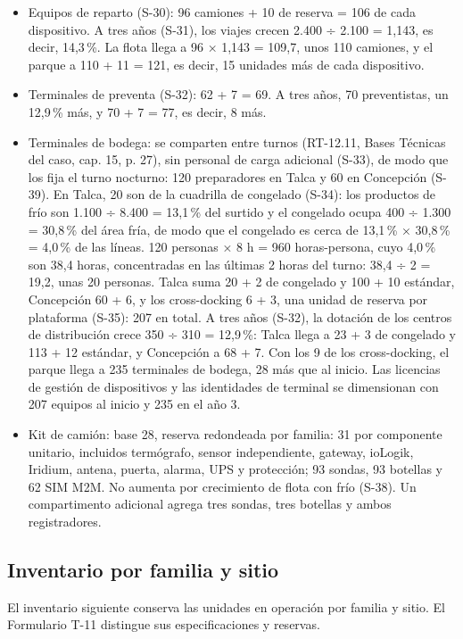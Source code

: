\begin{itemize}
  \item Equipos de reparto (S-30): 96 camiones + 10 de reserva = 106 de cada dispositivo. A tres años (S-31), los viajes crecen 2.400 ÷ 2.100 = 1,143, es decir, 14,3\,\%. La flota llega a 96 × 1,143 = 109,7, unos 110 camiones, y el parque a 110 + 11 = 121, es decir, 15 unidades más de cada dispositivo.
  \item Terminales de preventa (S-32): 62 + 7 = 69. A tres años, 70 preventistas, un 12,9\,\% más, y 70 + 7 = 77, es decir, 8 más.
  \item Terminales de bodega: se comparten entre turnos (RT-12.11, Bases Técnicas del caso, cap. 15, p. 27), sin personal de carga adicional (S-33), de modo que los fija el turno nocturno: 120 preparadores en Talca y 60 en Concepción (S-39). En Talca, 20 son de la cuadrilla de congelado (S-34): los productos de frío son 1.100 ÷ 8.400 = 13,1\,\% del surtido y el congelado ocupa 400 ÷ 1.300 = 30,8\,\% del área fría, de modo que el congelado es cerca de 13,1\,\% × 30,8\,\% = 4,0\,\% de las líneas. 120 personas × 8 h = 960 horas-persona, cuyo 4,0\,\% son 38,4 horas, concentradas en las últimas 2 horas del turno: 38,4 ÷ 2 = 19,2, unas 20 personas. Talca suma 20 + 2 de congelado y 100 + 10 estándar, Concepción 60 + 6, y los cross-docking 6 + 3, una unidad de reserva por plataforma (S-35): 207 en total. A tres años (S-32), la dotación de los centros de distribución crece 350 ÷ 310 = 12,9\,\%: Talca llega a 23 + 3 de congelado y 113 + 12 estándar, y Concepción a 68 + 7. Con los 9 de los cross-docking, el parque llega a 235 terminales de bodega, 28 más que al inicio. Las licencias de gestión de dispositivos y las identidades de terminal se dimensionan con 207 equipos al inicio y 235 en el año 3.
  \item Kit de camión: base 28, reserva redondeada por familia: 31 por componente unitario, incluidos termógrafo, sensor independiente, gateway, ioLogik, Iridium, antena, puerta, alarma, UPS y protección; 93 sondas, 93 botellas y 62 SIM M2M. No aumenta por crecimiento de flota con frío (S-38). Un compartimento adicional agrega tres sondas, tres botellas y ambos registradores.
\end{itemize}

\subsection*{Inventario por familia y sitio}
El inventario siguiente conserva las unidades en operación por familia y sitio. El Formulario T-11 distingue sus especificaciones y reservas.

